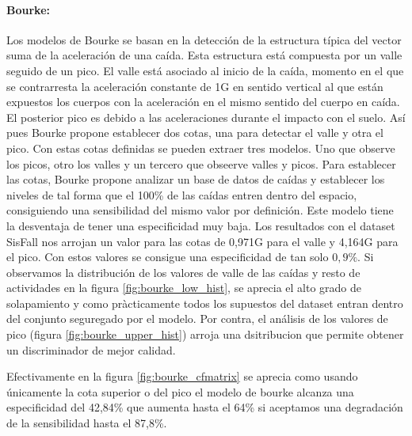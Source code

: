 \documentclass[../tfm.tex]{subfiles}
\begin{document}
\paragraph{Bourke:} Los modelos de Bourke \cite{Bourke2006} se basan en la detección de la estructura típica del vector suma de la aceleración de una caída. Esta estructura está compuesta por un valle seguido de un pico. El valle está asociado al inicio de la caída, momento en el que se contrarresta la aceleración constante de 1G en sentido vertical al que están expuestos los cuerpos con la aceleración en el mismo sentido del cuerpo en caída. El posterior pico es debido a las aceleraciones durante el impacto con el suelo. Así pues Bourke propone establecer dos cotas, una para detectar el valle y otra el pico. Con estas cotas definidas se pueden extraer tres modelos. Uno que observe los picos, otro los valles y un tercero que obseerve valles y picos.
Para establecer las cotas, Bourke propone analizar un base de datos de caídas y establecer los niveles de tal forma que el 100\% de las caídas entren dentro del espacio, consiguiendo una sensibilidad del mismo valor por definición. Este modelo tiene la desventaja de tener una especificidad muy baja. Los resultados con el dataset SisFall nos arrojan un valor para las cotas de 0,971G para el valle y 4,164G para el pico. Con estos valores se consigue una especificidad de tan solo $0,9\%$. Si observamos la distribución de los valores de valle de las caídas y resto de actividades en la figura \ref{fig:bourke_low_hist}, se aprecia el alto grado de solapamiento y como pràcticamente todos los supuestos del dataset entran dentro del conjunto seguregado por el modelo. Por contra, el análisis de los valores de pico (figura \ref{fig:bourke_upper_hist}) arroja una dsitribucion que permite obtener un discriminador de mejor calidad.


Efectivamente en la figura \ref{fig:bourke_cfmatrix} se aprecia como usando únicamente la cota superior o del pico el modelo de bourke alcanza una especificidad del 42,84\% que aumenta hasta el 64\% si aceptamos una degradación de la sensibilidad hasta el 87,8\%.

\end{document}
